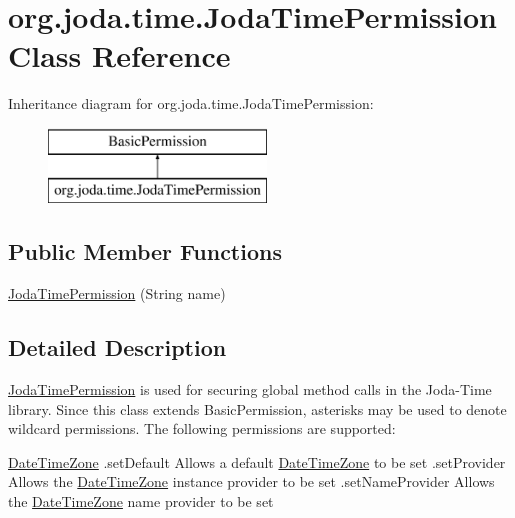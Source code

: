\hypertarget{classorg_1_1joda_1_1time_1_1_joda_time_permission}{\section{org.\-joda.\-time.\-Joda\-Time\-Permission Class Reference}
\label{classorg_1_1joda_1_1time_1_1_joda_time_permission}
}
Inheritance diagram for org.\-joda.\-time.\-Joda\-Time\-Permission\-:\begin{figure}[H]
\begin{center}
\leavevmode
\includegraphics[height=2.000000cm]{classorg_1_1joda_1_1time_1_1_joda_time_permission}
\end{center}
\end{figure}
\subsection*{Public Member Functions}
\begin{DoxyCompactItemize}
\item 
\hyperlink{classorg_1_1joda_1_1time_1_1_joda_time_permission_aee0f4ce565c7ca254079dd627074ab61}{Joda\-Time\-Permission} (String name)
\end{DoxyCompactItemize}


\subsection{Detailed Description}
\hyperlink{classorg_1_1joda_1_1time_1_1_joda_time_permission}{Joda\-Time\-Permission} is used for securing global method calls in the Joda-\/\-Time library. Since this class extends Basic\-Permission, asterisks may be used to denote wildcard permissions. The following permissions are supported\-:


\begin{DoxyPre}
\hyperlink{classorg_1_1joda_1_1time_1_1_date_time_zone}{DateTimeZone}
  .setDefault                 Allows a default \hyperlink{classorg_1_1joda_1_1time_1_1_date_time_zone}{DateTimeZone} to be set
  .setProvider                Allows the \hyperlink{classorg_1_1joda_1_1time_1_1_date_time_zone}{DateTimeZone} instance provider to be set
  .setNameProvider            Allows the \hyperlink{classorg_1_1joda_1_1time_1_1_date_time_zone}{DateTimeZone} name provider to be set\end{DoxyPre}



